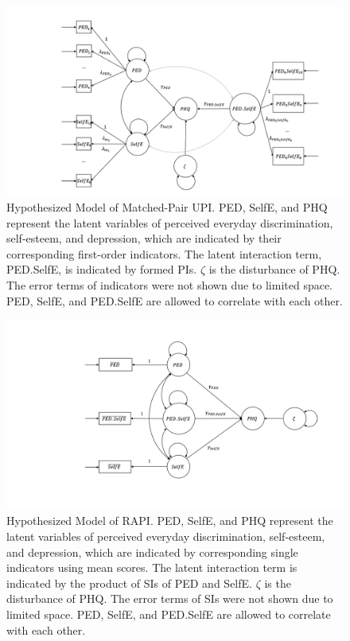 \documentclass[
  man]{apa7}
\begin{document}
\begin{figure}

{\centering \includegraphics[width=1\linewidth]{Introduction/Plots/Slide1} 

}

\caption{Hypothesized Model of Matched-Pair UPI. PED, SelfE, and PHQ represent the latent variables of perceived everyday discrimination, self-esteem, and depression, which are indicated by their corresponding first-order indicators. The latent interaction term, PED.SelfE, is indicated by formed PIs. $\zeta$ is the disturbance of PHQ. The error terms of indicators were not shown due to limited space. PED, SelfE, and PED.SelfE are allowed to correlate with each other.}\label{fig:figure-1}
\end{figure}

\begin{figure}

{\centering \includegraphics[width=1\linewidth]{Introduction/Plots/Slide2} 

}

\caption{Hypothesized Model of RAPI. PED, SelfE, and PHQ represent the latent variables of perceived everyday discrimination, self-esteem, and depression, which are indicated by corresponding single indicators using mean scores. The latent interaction term is indicated by the product of SIs of PED and SelfE. $\zeta$ is the disturbance of PHQ. The error terms of SIs were not shown due to limited space. PED, SelfE, and PED.SelfE are allowed to correlate with each other.}\label{fig:figure-2}
\end{figure}
\end{document}
